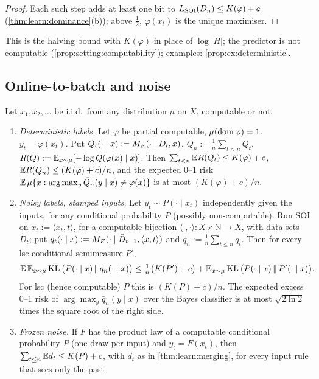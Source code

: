\begin{proof}
Each such step adds at least one bit to $L_{\mathrm{SOI}}(D_n)\le K(\varphi)+c$ (\cref{thm:learn:dominance}(b)); above $\frac12$, $\varphi(x_t)$ is the unique maximiser.
\end{proof}

This is the halving bound with $K(\varphi)$ in place of $\log|H|$; the predictor is not computable (\cref{prop:setting:computability}); examples: \cref{prop:ex:deterministic}.

\subsection{Online-to-batch and noise}\label{sec:learn:batch}

\begin{theorem}\label{thm:learn:batch}
Let $x_1,x_2,\ldots$ be i.i.d.\ from any distribution $\mu$ on $X$, computable or not.
\begin{enumerate}[label=(\alph*),leftmargin=*]
\item \emph{Deterministic labels.} Let $\varphi$ be partial computable, $\mu(\operatorname{dom}\varphi)=1$, $y_t=\varphi(x_t)$. Put $Q_t(\cdot\mid x):=M_{F}(\cdot\mid D_t,x)$, $\bar Q_n:=\frac1n\sum_{t<n}Q_t$, $R(Q):=\mathbb{E}_{x\sim\mu}[-\log Q(\varphi(x)\mid x)]$. Then $\sum_{t<n}\mathbb{E} R(Q_t)\le K(\varphi)+c$, $\mathbb{E} R(\bar Q_n)\le(K(\varphi)+c)/n$, and the expected 0--1 risk $\mathbb{E}\,\mu\{x:\arg\max_y\bar Q_n(y\mid x)\ne\varphi(x)\}$ is at most $(K(\varphi)+c)/n$.
\item \emph{Noisy labels, stamped inputs.} Let $y_t\sim P(\cdot\mid x_t)$ independently given the inputs, for any conditional probability $P$ (possibly non-computable). Run SOI on $\tilde x_t:=\langle x_t,t\rangle$, for a computable bijection $\langle\cdot,\cdot\rangle:X\times\mathbb N\to X$, with data sets $\tilde D_t$; put $q_t(\cdot\mid x):=M_{F}(\cdot\mid\tilde D_{t-1},\langle x,t\rangle)$ and $\bar q_n:=\frac1n\sum_{t\le n}q_t$. Then for every lsc conditional semimeasure $P'$,
\[ \mathbb{E}\,\mathbb{E}_{x\sim\mu}\operatorname{KL}\big(P(\cdot\mid x)\,\|\,\bar q_n(\cdot\mid x)\big)\le\tfrac1n\big(K(P')+c\big)+\mathbb{E}_{x\sim\mu}\operatorname{KL}\big(P(\cdot\mid x)\,\|\,P'(\cdot\mid x)\big). \]
For lsc (hence computable) $P$ this is $(K(P)+c)/n$. The expected excess 0--1 risk of $\arg\max_y\bar q_n(y\mid x)$ over the Bayes classifier is at most $\sqrt{2\ln2}$ times the square root of the right side.
\item \emph{Frozen noise.} If $F$ has the product law of a computable conditional probability $P$ (one draw per input) and $y_t=F(x_t)$, then $\sum_{t\le n}\mathbb{E} d_t\le K(P)+c$, with $d_t$ as in \cref{thm:learn:merging}, for every input rule that sees only the past.
\end{enumerate}
\end{theorem}

